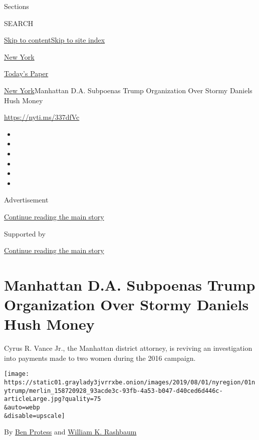 Sections

SEARCH

\protect\hyperlink{site-content}{Skip to
content}\protect\hyperlink{site-index}{Skip to site index}

\href{https://www.nytimes3xbfgragh.onion/section/nyregion}{New York}

\href{https://myaccount.nytimes3xbfgragh.onion/auth/login?response_type=cookie\&client_id=vi}{}

\href{https://www.nytimes3xbfgragh.onion/section/todayspaper}{Today's
Paper}

\href{/section/nyregion}{New York}\textbar{}Manhattan D.A. Subpoenas
Trump Organization Over Stormy Daniels Hush Money

\url{https://nyti.ms/337dfVc}

\begin{itemize}
\item
\item
\item
\item
\item
\item
\end{itemize}

Advertisement

\protect\hyperlink{after-top}{Continue reading the main story}

Supported by

\protect\hyperlink{after-sponsor}{Continue reading the main story}

\hypertarget{manhattan-da-subpoenas-trump-organization-over-stormy-daniels-hush-money}{%
\section{Manhattan D.A. Subpoenas Trump Organization Over Stormy Daniels
Hush
Money}\label{manhattan-da-subpoenas-trump-organization-over-stormy-daniels-hush-money}}

Cyrus R. Vance Jr., the Manhattan district attorney, is reviving an
investigation into payments made to two women during the 2016 campaign.

\texttt{[image: https://static01.graylady3jvrrxbe.onion/images/2019/08/01/nyregion/01nytrump/merlin\_158720928\_93acde3c-93fb-4a53-b047-d40ced6d446c-articleLarge.jpg?quality=75\\\&auto=webp\\\&disable=upscale]}

By \href{https://www.nytimes3xbfgragh.onion/by/ben-protess}{Ben Protess}
and
\href{https://www.nytimes3xbfgragh.onion/by/william-k-rashbaum}{William
K. Rashbaum}

